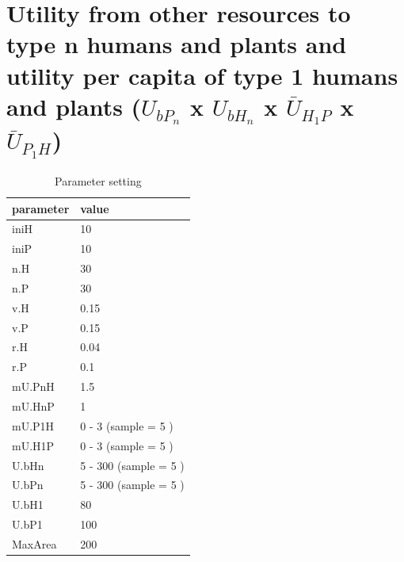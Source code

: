 \documentclass[]{book}
\begin{document}
\newpage

\hypertarget{utility-from-other-resources-to-type-n-humans-and-plants-and-utility-per-capita-of-type-1-humans-and-plants-u_bp_n-x-u_bh_n-x-baru_h_1p-x-baru_p_1h}{%
\section{\texorpdfstring{Utility from other resources to type n humans and plants and utility per capita of type 1 humans and plants (\(U_{bP_{n}}\) x \(U_{bH_{n}}\) x \(\bar{U}_{H_{1}P}\) x \(\bar{U}_{P_{1}H}\))}{Utility from other resources to type n humans and plants and utility per capita of type 1 humans and plants (U\_\{bP\_\{n\}\} x U\_\{bH\_\{n\}\} x \textbackslash{}bar\{U\}\_\{H\_\{1\}P\} x \textbackslash{}bar\{U\}\_\{P\_\{1\}H\})}}\label{utility-from-other-resources-to-type-n-humans-and-plants-and-utility-per-capita-of-type-1-humans-and-plants-u_bp_n-x-u_bh_n-x-baru_h_1p-x-baru_p_1h}}


\begin{table}[!h]

\caption{\label{tab:4UbnmU1tablepdf}Parameter setting}
\centering
\begin{tabular}{l|l}
\hline
parameter & value\\
\hline
iniH & 10\\
\hline
iniP & 10\\
\hline
n.H & 30\\
\hline
n.P & 30\\
\hline
v.H & 0.15\\
\hline
v.P & 0.15\\
\hline
r.H & 0.04\\
\hline
r.P & 0.1\\
\hline
mU.PnH & 1.5\\
\hline
mU.HnP & 1\\
\hline
mU.P1H & 0 - 3 (sample = 5 )\\
\hline
mU.H1P & 0 - 3 (sample = 5 )\\
\hline
U.bHn & 5 - 300 (sample = 5 )\\
\hline
U.bPn & 5 - 300 (sample = 5 )\\
\hline
U.bH1 & 80\\
\hline
U.bP1 & 100\\
\hline
MaxArea & 200\\
\hline
\end{tabular}
\end{table}
\end{document}
